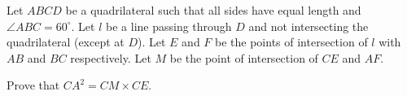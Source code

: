 Let $ABCD$ be a quadrilateral such that all sides have equal length and $\angle{ABC} =60^\circ$.  Let $l$ be a line passing through $D$ and not intersecting the quadrilateral (except at $D$).  Let $E$ and $F$ be the points of intersection of $l$ with $AB$ and $BC$ respectively.  Let $M$ be the point of intersection of $CE$ and $AF$.

Prove that $CA^2 = CM \times CE$.